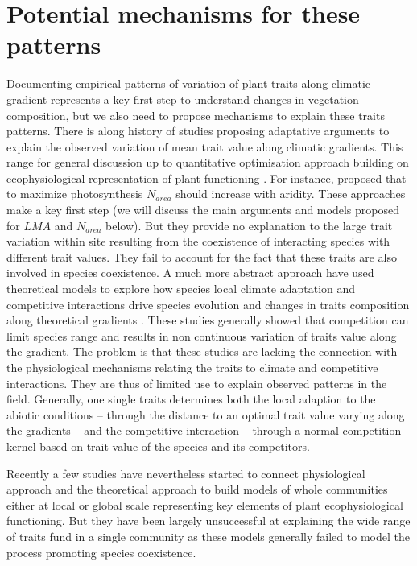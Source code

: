 \documentclass[a4paper,11pt]{article}
\begin{document}
\section{Potential mechanisms for these patterns}

Documenting empirical patterns of variation of plant traits along climatic gradient represents a key first step to understand changes in vegetation composition, but we also need to propose mechanisms to explain these traits patterns. There is along history of studies proposing adaptative arguments to explain the observed variation of mean trait value along climatic gradients. This range for general discussion up to quantitative optimisation approach building on ecophysiological representation of plant functioning \citep{Makela-2002}. For instance, \citet{Wright-2003} proposed that to maximize photosynthesis $N_{area}$ should increase with aridity. These approaches make a key first step (we will discuss the main arguments and models proposed for $LMA$ and $N_{area}$ below). But they provide no explanation to the large trait variation within site resulting from the coexistence of interacting species with different trait values. They fail to account for the fact that these traits are also involved in species coexistence. A much more abstract approach have used theoretical models to explore how species local climate adaptation and competitive interactions drive species evolution and changes in traits composition along theoretical gradients \citep{Case-2000,Doebeli-2003,Goldberg-2006,Leimar-2008}. These studies generally showed that competition can limit species range and results in non continuous variation of traits value along the gradient. The problem is that these studies are lacking the connection with the physiological mechanisms relating the traits to climate and competitive interactions. They are thus of limited use to explain observed patterns in the field. Generally, one single traits determines both the local adaption to the abiotic conditions -- through the distance to an optimal trait value varying along the gradients -- and the competitive interaction -- through a normal competition kernel based on trait value of the species and its competitors\citep[see][]{Case-2000}.  

Recently a few studies have nevertheless started to connect physiological approach and the theoretical approach to build models of whole communities either at local \citep{Farrior-2013} or global scale \citep[see][]{Sakschewski-2015,Scheiter-2013} representing key elements of plant ecophysiological functioning. But they have been largely unsuccessful at explaining the wide range of traits fund in a single community as these models generally failed to model the process promoting species coexistence.
\end{document}
